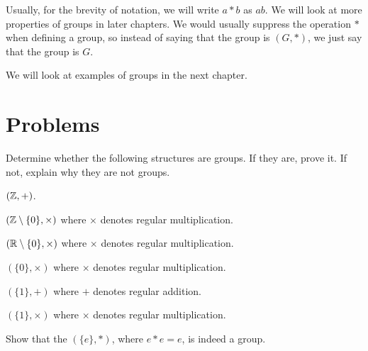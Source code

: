 Usually, for the brevity of notation, we will write $a \ast b$ as $ab$. We will look at more properties of groups in later chapters. We would usually suppress the operation $\ast$ when defining a group, so instead of saying that the group is $(G, \ast)$, we just say that the group is $G$.

We will look at examples of groups in the next chapter.

\newpage

\section{Problems}
\begin{problem}
Determine whether the following structures are groups. If they are, prove it. If not, explain why they are not groups.
\begin{partquestions}{\alph*}
    \item $(\mathbb{Z}, +)$.
    \item $(\mathbb{Z} \setminus \{0\}, \times)$ where $\times$ denotes regular multiplication.
    \item $(\mathbb{R} \setminus \{0\}, \times)$ where $\times$ denotes regular multiplication.
    \item $(\{0\}, \times)$ where $\times$ denotes regular multiplication.
    \item $(\{1\}, +)$ where $+$ denotes regular addition.
    \item $(\{1\}, \times)$ where $\times$ denotes regular multiplication.
\end{partquestions}
\end{problem}

\begin{problem}
    Show that the  $(\{e\}, *)$, where $e \ast e = e$, is indeed a group.
\end{problem}

